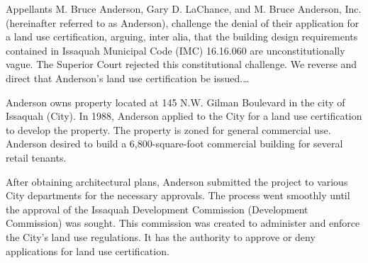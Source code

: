 

Appellants M. Bruce Anderson, Gary D. LaChance, and M. Bruce Anderson, Inc.
(hereinafter referred to as Anderson), challenge the denial of their application
for a land use certification, arguing, inter alia, that the building design
requirements contained in Issaquah Municipal Code (IMC) 16.16.060 are
unconstitutionally vague. The Superior Court rejected this constitutional
challenge. We reverse and direct that Anderson's land use certification be
issued.\ldots 



Anderson owns property located at 145 N.W. Gilman Boulevard in the city of
Issaquah (City). In 1988, Anderson applied to the City for a land use
certification to develop the property. The property is zoned for general
commercial use. Anderson desired to build a 6,800-square-foot commercial
building for several retail tenants.

After obtaining architectural plans, Anderson submitted the project to various
City departments for the necessary approvals. The process went smoothly until
the approval of the Issaquah Development Commission (Development Commission) was
sought. This commission was created to administer and enforce the City's land
use regulations. It has the authority to approve or deny applications for land
use certification.

